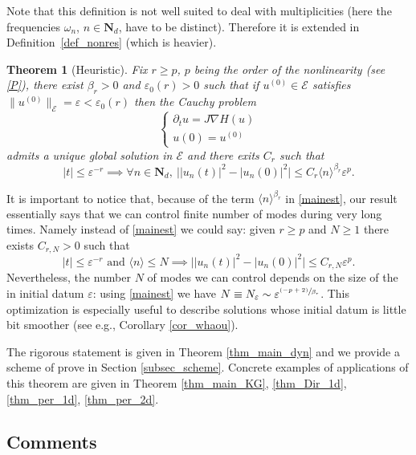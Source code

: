 \documentclass[11pt]{article}
\newcommand{\eg}{e.g.,\xspace}
\newcommand{\Subsection}{\subsection}
\newcommand{\psfrac}[2]{\sfrac{(#1)}{#2}}
\newtheorem{theorem}{Theorem}[section]
\theoremstyle{definition}
\begin{document}
Note that this definition is not well suited to deal with multiplicities (here the frequencies $\omega_n$, $n\in \mathbf{N}_d$, have to be distinct). Therefore it is extended in Definition~\ref{def_nonres} (which is heavier).

\begin{theorem}[Heuristic]\label{sketch}
Fix $r\geq p$, $p$ being the order of the nonlinearity (see \eqref{P}), there exist $\beta_r>0$ and $\varepsilon_0(r)>0$ such that if $u^{(0)} \in{\mathcal{E}}$ satisfies $\| u^{(0)} \|_{{\mathcal{E}}}=\varepsilon<\varepsilon_0(r)$ then the Cauchy problem
\[
\begin{cases}\partial_t u=J\nabla H(u)\\u(0)=u^{(0)} \end{cases}
\]
admits a unique global solution in $\mathcal E$ and there exits $C_r$ such that
\begin{equation}\label{mainest}
|t|\leq \varepsilon^{-r} \implies \forall n\in \mathbf{N}_d,\ \bigl ||u_n(t)|^2-|u_n(0)|^2\bigr|\leq C_r\langle n\rangle^{\beta_r}\varepsilon^p.
\end{equation}
\end{theorem}
It is important to notice that, because of the term $\langle n\rangle^{\beta_r}$ in \eqref{mainest}, our result essentially says that we can control finite number of modes during very long times. Namely instead of \eqref{mainest} we could say: given $r\geq p$ and $N\geq 1$ there exists $C_{r,N}>0$ such that
\[
|t|\leq \varepsilon^{-r} \text{ and } \langle n\rangle\leq N \implies \bigl ||u_n(t)|^2-|u_n(0)|^2\bigr|\leq C_{r,N}\varepsilon^p.
\]
Nevertheless, the number $N$ of modes we can control depends on the size of the in initial datum $\varepsilon$: using \eqref{mainest} we have $N\equiv N_\varepsilon\sim \varepsilon^{\psfrac{-p+2}{\beta_r}}$. This optimization is especially useful to describe solutions whose initial datum is little bit smoother (see \eg Corollary \ref{cor_whaou}).

The rigorous statement is given in Theorem \ref{thm_main_dyn} and we provide a scheme of prove in Section \ref{subsec_scheme}. Concrete examples of applications of this theorem are given in Theorem \ref{thm_main_KG}, \ref{thm_Dir_1d}, \ref{thm_per_1d}, \ref{thm_per_2d}.

\Subsection{Comments}
\end{document}
